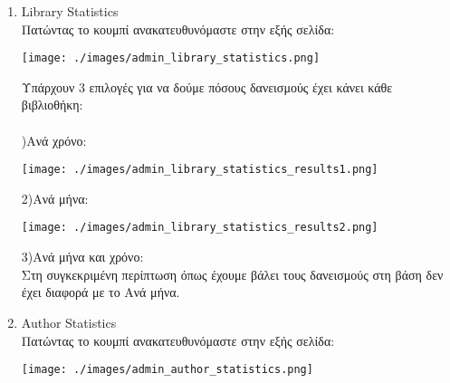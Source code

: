 \documentclass[14pt]{report}
\begin{document}
\begin{enumerate}
		\newpage
		\begin{enumerate}
			\hypertarget{a-library-stats}{}
			\item Library Statistics \\
			Πατώντας το κουμπί ανακατευθυνόμαστε στην εξής σελίδα: \\
			
			\vspace{\baselineskip}
			
			\texttt{[image: ./images/admin\_library\_statistics.png]}
			
			\vspace{\baselineskip}
			
			Υπάρχουν 3 επιλογές για να δούμε πόσους δανεισμούς έχει κάνει κάθε βιβλιοθήκη: \\ \\
			)Ανά χρόνο: \\
			
			\vspace{\baselineskip}
			
			\texttt{[image: ./images/admin\_library\_statistics\_results1.png]}
			
			\newpage
			\vspace{\baselineskip}
			2)Ανά μήνα: \\
			
			\vspace{\baselineskip}
			
			\texttt{[image: ./images/admin\_library\_statistics\_results2.png]}
			
			\vspace{\baselineskip}
			3)Ανά μήνα και χρόνο: \\	
			Στη συγκεκριμένη περίπτωση όπως έχουμε βάλει τους δανεισμούς στη βάση δεν έχει διαφορά με το Ανά μήνα. \\
			
			\newpage
			\hypertarget{a-author-stats}{}
			\item Author Statistics \\
			Πατώντας το κουμπί ανακατευθυνόμαστε στην εξής σελίδα: \\
			
			\vspace{\baselineskip}
			
			\texttt{[image: ./images/admin\_author\_statistics.png]}
			
			\vspace{\baselineskip}
			

\end{enumerate}
\end{enumerate}
\end{document}
